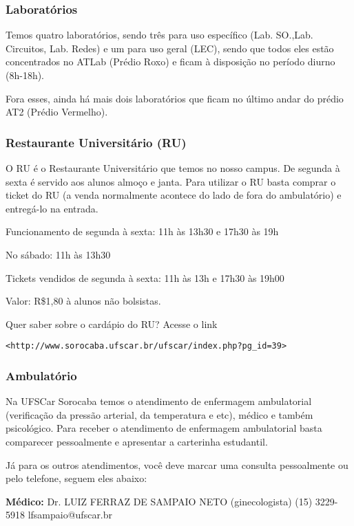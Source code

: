 \subsubsection{Laboratórios}
Temos quatro laboratórios, sendo três para uso específico (Lab. SO.,Lab.
Circuitos, Lab. Redes) e um para uso geral (LEC), sendo que todos eles estão
concentrados no ATLab (Prédio Roxo) e ficam à disposição no período diurno (8h-18h).

Fora esses, ainda há mais dois laboratórios que ficam no último andar do prédio AT2 (Prédio Vermelho).

\subsubsection{Restaurante Universitário (RU)}
O RU é o Restaurante Universitário que temos no nosso campus. De segunda à sexta é servido aos alunos almoço e janta. Para utilizar o RU basta comprar o ticket do RU (a venda normalmente acontece do lado de fora do ambulatório) e entregá-lo na entrada.

Funcionamento de segunda à sexta: 11h às 13h30 e 17h30 às 19h

No sábado: 11h às 13h30

Tickets vendidos de segunda à sexta: 11h às 13h e 17h30 às 19h00

Valor: R\$1,80 à alunos não bolsistas.

Quer saber sobre o cardápio do RU? Acesse o link

\texttt{<http://www.sorocaba.ufscar.br/ufscar/index.php?pg\_id=39>}

\subsubsection{Ambulatório}
Na UFSCar Sorocaba temos o atendimento de enfermagem ambulatorial (verificação da pressão arterial, da temperatura e etc), médico e também psicológico. Para receber o atendimento de enfermagem ambulatorial basta comparecer pessoalmente e apresentar a carterinha estudantil.

Já para os outros atendimentos, você deve marcar uma consulta pessoalmente ou pelo telefone, seguem eles abaixo:

\noindent \textbf{Médico:}
\newline Dr. LUIZ FERRAZ DE SAMPAIO NETO (ginecologista)
\newline (15) 3229-5918
\newline lfsampaio@ufscar.br

